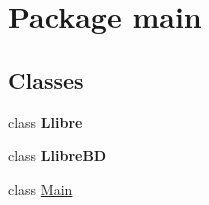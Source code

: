 \hypertarget{namespacemain}{\section{Package main}
\label{namespacemain}
}
\subsection*{Classes}
\begin{DoxyCompactItemize}
\item 
class {\bfseries Llibre}
\item 
class {\bfseries Llibre\-B\-D}
\item 
class \hyperlink{classmain_1_1_main}{Main}
\end{DoxyCompactItemize}

